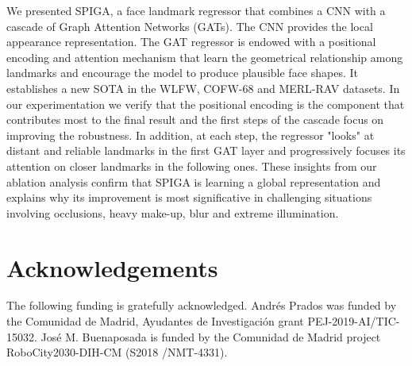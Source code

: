 \documentclass{bmvc2k}
\begin{document}
We presented SPIGA, a face landmark regressor that combines a CNN with a cascade of Graph Attention Networks (GATs). The CNN provides the local appearance representation. The GAT regressor is endowed with a positional encoding and attention mechanism that learn the geometrical relationship among landmarks and encourage the model to produce plausible face shapes. It establishes a new SOTA in the WLFW, COFW-68 and MERL-RAV datasets. In our experimentation we verify that the positional encoding is the component that contributes most to the final result and the first steps of the cascade focus on improving the robustness. 
In addition, at each step, the regressor "looks" at distant and reliable landmarks in the first GAT layer and progressively focuses its attention on closer landmarks in the following ones.  These insights from our ablation analysis confirm that SPIGA is learning a global representation and explains why its improvement is most significative in challenging situations involving occlusions, heavy make-up, blur and extreme illumination.


\section*{Acknowledgements}

The following funding is gratefully acknowledged. Andr{\'e}s Prados was funded by the Comunidad de Madrid, Ayudantes de Investigaci{\'o}n grant PEJ-2019-AI/TIC-15032. Jos{\'e} M. Buenaposada is funded by the Comunidad de Madrid project RoboCity2030-DIH-CM (S2018 /NMT-4331).


\end{document}
